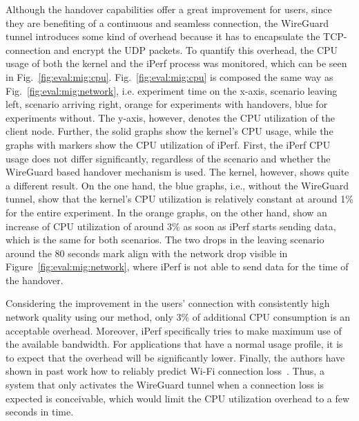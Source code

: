 Although the handover capabilities offer a great improvement for users, since they are benefiting of a continuous and seamless connection, the WireGuard tunnel introduces some kind of overhead because it has to encapsulate the TCP-connection and encrypt the UDP packets.
To quantify this overhead, the CPU usage of both the kernel and the iPerf process was monitored, which can be seen in Fig.~\ref{fig:eval:mig:cpu}.
Fig.~\ref{fig:eval:mig:cpu} is composed the same way as Fig.~\ref{fig:eval:mig:network}, i.e. experiment time on the x-axis, scenario leaving left, scenario arriving right, orange for experiments with handovers, blue for experiments without.
The y-axis, however, denotes the CPU utilization of the client node.
Further, the solid graphs show the kernel's CPU usage, while the graphs with markers show the CPU utilization of iPerf.
First, the iPerf CPU usage does not differ significantly, regardless of the scenario and whether the WireGuard based handover mechanism is used.
The kernel, however, shows quite a different result.
On the one hand, the blue graphs, i.e., without the WireGuard tunnel, show that the kernel's CPU utilization is relatively constant at around 1\% for the entire experiment.
In the orange graphs, on the other hand, show an increase of CPU utilization of around 3\% as soon as iPerf starts sending data, which is the same for both scenarios.
The two drops in the leaving scenario around the 80 seconds mark align with the network drop visible in Figure~\ref{fig:eval:mig:network}, where iPerf is not able to send data for the time of the handover.

Considering the improvement in the users' connection with consistently high network quality using our method, only 3\% of additional CPU consumption is an acceptable overhead.
Moreover, iPerf specifically tries to make maximum use of the available bandwidth.
For applications that have a normal usage profile, it is to expect that the overhead will be significantly lower.
Finally, the authors have shown in past work how to reliably predict Wi-Fi connection loss~\cite{hochst2019learning}.
Thus, a system that only activates the WireGuard tunnel when a connection loss is expected is conceivable, which would limit the CPU utilization overhead to a few seconds in time.
